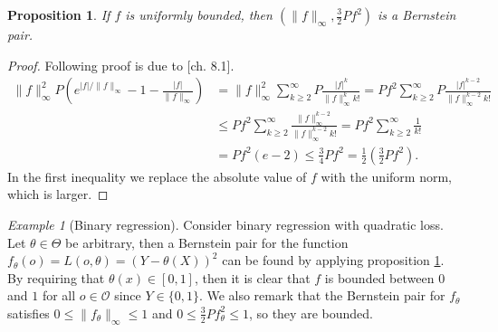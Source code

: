\documentclass[11pt, a4paper]{article}
\newcommand\norm[1]{\lVert#1\rVert}
\newtheorem{proposition}[theorem]{Proposition}
\theoremstyle{definition}
\theoremstyle{remark}
\newtheorem{example}{Example}
\newcommand{\btheta}{\theta}
\begin{document}
\begin{proposition} \label{unifbernstein}
    If $ f $ is uniformly bounded, then $ (\norm{f}_{\infty}, \frac{3}{2} Pf^2 ) $ is a Bernstein pair. 
\end{proposition}
\begin{proof}
    Following proof is due to \parencite{vaart06}[ch. 8.1]. 
    \begin{align*}
        \norm{f}_{\infty}^2 P\left( e^{|f|/\norm{f}_{\infty}} -1 - \frac{|f|}{\norm{f}_{\infty}}\right) &= \norm{f}_{\infty}^{2} \sum_{k \geq 2}^{\infty} P \frac{|f|^{k}}{\norm{f}^{k}_{\infty}k!} = Pf^2 \sum_{k \geq 2}^{\infty} P\frac{|f|^{k-2}}{\norm{f}^{k-2}_{\infty} k! } \\
                                                                                                        &\leq P f^2 \sum_{k \geq 2}^{\infty} \frac{\norm{f}_{\infty}^{k-2}}{\norm{f}^{k-2}_{\infty} k! } = P f^2 \sum_{k \geq 2}^{\infty} \frac{1}{k !}\\
                                                                                                        &= P f^2 (e-2)\leq \frac{3}{4} P f^2 = \frac{1}{2} \left(\frac{3}{2} Pf^2\right). 
    \end{align*}
   In the first inequality we replace the absolute value of $ f $ with the uniform norm, which is larger. 
\end{proof}

\begin{example}[Binary regression] \label{ex:bernsteinexample}
    Consider binary regression with quadratic loss. Let $ \btheta \in \Theta $ be arbitrary, then a Bernstein pair for the function $ f_{\btheta}(o) = L(o, \btheta) = (Y - \theta(X))^2$ can be found by applying proposition \ref{unifbernstein}. By requiring that $ \theta(x) \in [0,1] $, then it is clear that $ f $ is bounded between $ 0 $ and $ 1 $ for all $ o \in \mathcal{O} $ since $ Y \in \{0,1\} $. We also remark that the Bernstein pair for $ f_{\btheta} $ satisfies $ 0 \leq \norm{f_\theta}_{\infty} \leq 1 $ and $ 0 \leq \frac{3}{2}Pf_{\btheta}^2 \leq 1 $, so they are bounded. 

\end{example}
\end{document}
